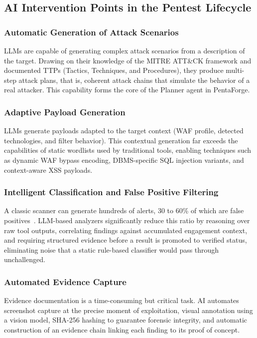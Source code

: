 \documentclass[12pt,a4paper]{report}
\begin{document}
\subsection{AI Intervention Points in the Pentest Lifecycle}

\subsubsection{Automatic Generation of Attack Scenarios}

LLMs are capable of generating complex attack scenarios from a description of the
target. Drawing on their knowledge of the MITRE ATT\&CK framework and documented
TTPs (Tactics, Techniques, and Procedures), they produce multi-step attack plans,
that is, coherent attack chains that simulate the behavior of a real attacker. This
capability forms the core of the Planner agent in PentaForge.

\subsubsection{Adaptive Payload Generation}

LLMs generate payloads adapted to the target context (WAF profile, detected
technologies, and filter behavior). This contextual generation far exceeds the
capabilities of static wordlists used by traditional tools, enabling techniques
such as dynamic WAF bypass encoding, DBMS-specific SQL injection variants, and
context-aware XSS payloads.

\subsubsection{Intelligent Classification and False Positive Filtering}

A classic scanner can generate hundreds of alerts, 30 to 60\% of which are false
positives~\cite{threatexploitFP}. LLM-based analyzers significantly reduce this
ratio by reasoning over raw tool outputs, correlating findings against accumulated
engagement context, and requiring structured evidence before a result is promoted
to verified status, eliminating noise that a static rule-based classifier would
pass through unchallenged.

\subsubsection{Automated Evidence Capture}

Evidence documentation is a time-consuming but critical task. AI automates
screenshot capture at the precise moment of exploitation, visual annotation using
a vision model, SHA-256 hashing to guarantee forensic integrity, and automatic
construction of an evidence chain linking each finding to its proof of concept.
\end{document}

